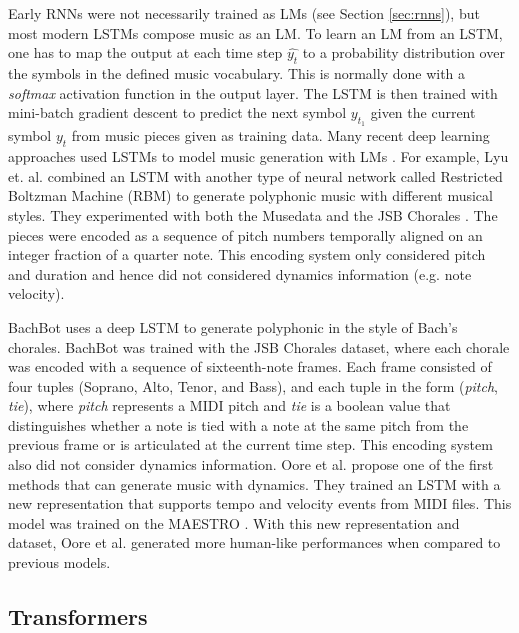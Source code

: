 
Early RNNs were not necessarily trained as LMs (see Section \ref{sec:rnns}), but most modern LSTMs compose music as an LM. To learn an LM from an LSTM, one has to map the output at each time step $\hat{y_t}$ to a probability distribution over the symbols in the defined music vocabulary. This is normally done with a \textit{softmax} activation function in the output layer. The LSTM is then trained with mini-batch gradient descent to predict the next symbol $y_{t_1}$ given the current symbol $y_t$ from music pieces given as training data. Many recent deep learning approaches used LSTMs to model music generation with LMs \cite{briot2017deep}. For example, Lyu et. al. \cite{lyu2015modelling} combined an LSTM with another type of neural network called Restricted Boltzman Machine (RBM) to generate polyphonic music with different musical styles. They experimented with both the Musedata and the JSB Chorales \cite{boulanger2012modeling}. The pieces were encoded as a sequence of pitch numbers temporally aligned on an integer fraction of a quarter note. This encoding system only considered pitch and duration and hence did not considered dynamics information (e.g. note velocity).

BachBot \cite{liang2017automatic} uses a deep LSTM to generate polyphonic in the style of Bach’s chorales. BachBot was trained with the JSB Chorales dataset, where each chorale was encoded with a sequence of sixteenth-note frames. Each frame consisted of four tuples (Soprano, Alto, Tenor, and Bass), and each tuple in the form (\textit{pitch}, \textit{tie}), where \textit{pitch} represents a MIDI pitch and \textit{tie} is a boolean value that distinguishes whether a note is tied with a note at the same pitch from the previous frame or is articulated at the current time step. This encoding system also did not consider dynamics information. Oore et al. \cite{oore2017learning} propose one of the first methods that can generate music with dynamics. They trained an LSTM with a new representation that supports tempo and velocity events from MIDI files. This model was trained on the MAESTRO \cite{hawthorne2018enabling}. With this new representation and dataset, Oore et al. \cite{oore2017learning} generated more human-like performances when compared to previous models.

\subsection{Transformers}

